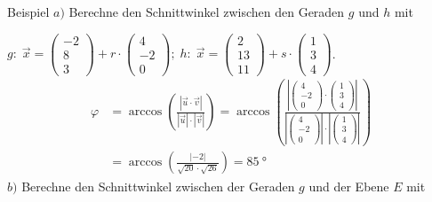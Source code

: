 \documentclass{article}
\begin{document}
    \begin{boxx}[DarkBlue]{Beispiel}
        $a)$\hspace*{3mm} Berechne den Schnittwinkel zwischen den Geraden $g$ und $h$ mit

        \hspace*{8mm}$\displaystyle g:\;\vec{x} = \begin{pmatrix}-2\\8\\3\end{pmatrix} + r \cdot \begin{pmatrix}4\\-2\\0\end{pmatrix};\; h:\; \vec{x} = \begin{pmatrix}2\\13\\11\end{pmatrix} + s \cdot \begin{pmatrix}1\\3\\4\end{pmatrix}$.
        \begin{align*}
            \varphi &= \arccos\left(\frac{|\vec{u} \cdot \vec{v}|}{|\vec{u}|\cdot|\vec{v}|}\right)
            = \arccos\left(\frac{\left|\begin{pmatrix}4\\-2\\0\end{pmatrix} \cdot \begin{pmatrix}1\\3\\4\end{pmatrix}\right|}{\left|\begin{pmatrix}4\\-2\\0\end{pmatrix}\right| \cdot \left|\begin{pmatrix}1\\3\\4\end{pmatrix}\right|}\right)\\
            &= \arccos\left(\frac{|-2|}{\sqrt{20}\cdot\sqrt{26}}\right) =\qty{85}{\degree}
        \end{align*}
        $b)$\hspace*{3mm} Berechne den Schnittwinkel zwischen der Geraden $g$ und der Ebene $E$ mit
        

\end{boxx}
\end{document}
